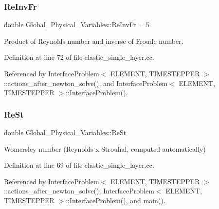\mbox{\label{namespaceGlobal__Physical__Variables_aa6286f02b476912dd7550eced538331a}} 
\subsubsection{\texorpdfstring{Re\+Inv\+Fr}{ReInvFr}}
{\footnotesize\ttfamily double Global\+\_\+\+Physical\+\_\+\+Variables\+::\+Re\+Inv\+Fr = 5.}



Product of Reynolds number and inverse of Froude number. 



Definition at line 72 of file elastic\+\_\+single\+\_\+layer.\+cc.



Referenced by Interface\+Problem$<$ E\+L\+E\+M\+E\+N\+T, T\+I\+M\+E\+S\+T\+E\+P\+P\+E\+R $>$\+::actions\+\_\+after\+\_\+newton\+\_\+solve(), and Interface\+Problem$<$ E\+L\+E\+M\+E\+N\+T, T\+I\+M\+E\+S\+T\+E\+P\+P\+E\+R $>$\+::\+Interface\+Problem().

\mbox{\label{namespaceGlobal__Physical__Variables_a085ee4bf968ffdd01a41b8c41864f907}} 
\subsubsection{\texorpdfstring{Re\+St}{ReSt}}
{\footnotesize\ttfamily double Global\+\_\+\+Physical\+\_\+\+Variables\+::\+Re\+St}



Womersley number (Reynolds x Strouhal, computed automatically) 



Definition at line 69 of file elastic\+\_\+single\+\_\+layer.\+cc.



Referenced by Interface\+Problem$<$ E\+L\+E\+M\+E\+N\+T, T\+I\+M\+E\+S\+T\+E\+P\+P\+E\+R $>$\+::actions\+\_\+after\+\_\+newton\+\_\+solve(), Interface\+Problem$<$ E\+L\+E\+M\+E\+N\+T, T\+I\+M\+E\+S\+T\+E\+P\+P\+E\+R $>$\+::\+Interface\+Problem(), and main().


